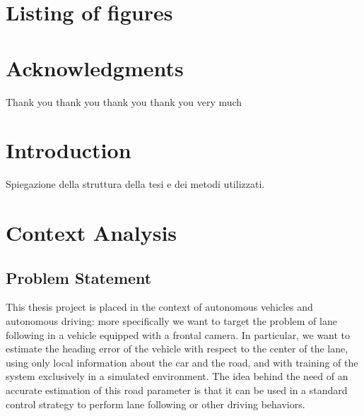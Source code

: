 \documentclass[a4paper,12pt,sort&compress]{article}
\begin{document}
\tableofcontents
\newpage

\section{Listing of figures}

    \newpage


\section{Acknowledgments}

    Thank you thank you thank you thank you very much
    \newpage


\section{Introduction}

    Spiegazione della struttura della tesi e dei metodi utilizzati.
    \newpage


\section{Context Analysis}

\subsection{Problem Statement}
    This thesis project is placed in the context of autonomous vehicles and
    autonomous driving: more specifically we want to target the problem of lane
    following in a vehicle equipped with a frontal camera. In particular, we
    want to estimate the heading error of the vehicle with respect to the center
    of the lane, using only
    local information about the car and the road, and with training of the system exclusively in a simulated environment. The idea behind the need of an
    accurate estimation of this road parameter is that it can be used in a
    standard control strategy to perform lane following or other driving
    behaviors.
\end{document}
